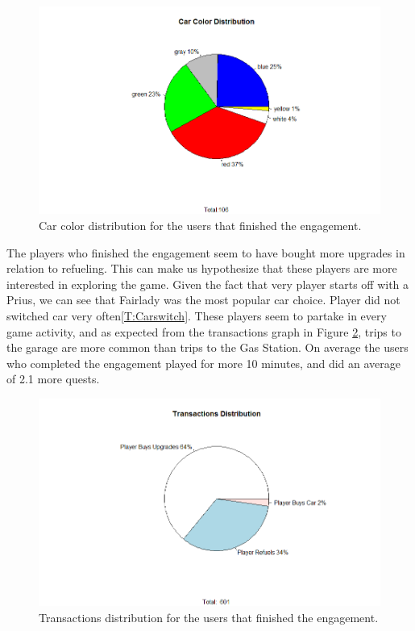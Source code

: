 \documentclass[preprint,authoryear,12pt]{elsarticle}
\begin{document}
\begin{figure}[htb]
	\begin{center}
		\includegraphics[width=.95\linewidth]{ijhcs14-img/Color}
		\caption{Car color distribution for the users that finished the engagement.\label{fig:engagementcolor}}
	\end{center}
\end{figure}

The players who finished the engagement seem to have bought more upgrades in relation to refueling. This can make us hypothesize that these players are more interested in exploring the game.
Given the fact that very player starts off with a Prius, we can see that Fairlady was the most popular car choice. Player did not switched car very often\ref{T:Carswitch}. These players seem to partake in every game activity, and as expected from the transactions graph in Figure \ref{fig:engagementtransactions}, trips to the garage are more common than trips to the Gas Station.
On average the users who completed the engagement played for more 10 minutes, and did an average of 2.1 more quests.

\begin{figure}[htb]
	\begin{center}
		\includegraphics[width=.95\linewidth]{ijhcs14-img/Transactions}
		\caption{Transactions distribution for the users that finished the engagement.\label{fig:engagementtransactions}}
	\end{center}
\end{figure}
\end{document}
